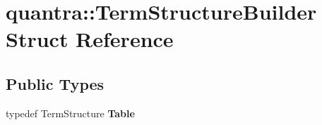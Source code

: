 \hypertarget{structquantra_1_1TermStructureBuilder}{}\section{quantra\+:\+:Term\+Structure\+Builder Struct Reference}
\label{structquantra_1_1TermStructureBuilder}
\subsection*{Public Types}
\begin{DoxyCompactItemize}
\item 
\mbox{\label{structquantra_1_1TermStructureBuilder_addd48f4ba371769897bf4f984ef6752b}} 
typedef Term\+Structure {\bfseries Table}
\end{DoxyCompactItemize}
